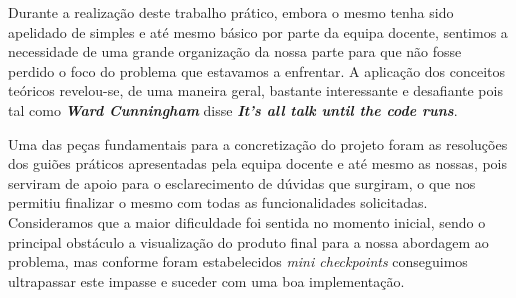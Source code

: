 \documentclass[11pt,a4paper]{report}
\begin{document}
Durante a realização deste trabalho prático, embora o mesmo tenha sido apelidado de simples e até mesmo básico por parte da equipa docente, sentimos a necessidade de uma grande organização da nossa parte para que não fosse perdido o foco do problema que estavamos a enfrentar. A aplicação dos conceitos teóricos revelou-se, de uma maneira geral, bastante interessante e desafiante pois tal como \emph{\textbf{Ward Cunningham}} disse \emph{\textbf{It's all talk until the code runs}}. 

Uma das peças fundamentais para a concretização do projeto foram as resoluções dos guiões práticos apresentadas pela equipa docente e até mesmo as nossas, pois serviram de apoio para o esclarecimento de dúvidas que surgiram, o que nos permitiu finalizar o mesmo com todas as funcionalidades solicitadas. Consideramos que a maior dificuldade foi sentida no momento inicial, sendo o principal obstáculo a visualização do produto final para a nossa abordagem ao problema, mas conforme foram estabelecidos \emph{mini checkpoints} conseguimos ultrapassar este impasse e suceder com uma boa implementação.
\end{document}
